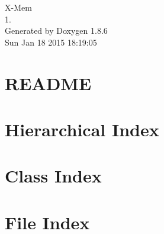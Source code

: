 \documentclass[twoside]{book}
\newcommand{\clearemptydoublepage}{%
  \newpage{\pagestyle{empty}\cleardoublepage}%
}
\begin{document}
\hypersetup{pageanchor=false}
\begin{titlepage}
\vspace*{7cm}
\begin{center}%
{\Large X-\/\-Mem \\[1ex]\large 1. }\\
\vspace*{1cm}
{\large Generated by Doxygen 1.8.6}\\
\vspace*{0.5cm}
{\small Sun Jan 18 2015 18:19:05}\\
\end{center}
\end{titlepage}
\clearemptydoublepage
\tableofcontents
\clearemptydoublepage
{}
\hypersetup{pageanchor=true}

\chapter{R\-E\-A\-D\-M\-E}
\label{md_src__r_e_a_d_m_e}
\hypertarget{md_src__r_e_a_d_m_e}{}

\chapter{Hierarchical Index}

\chapter{Class Index}

\chapter{File Index}

\end{document}
